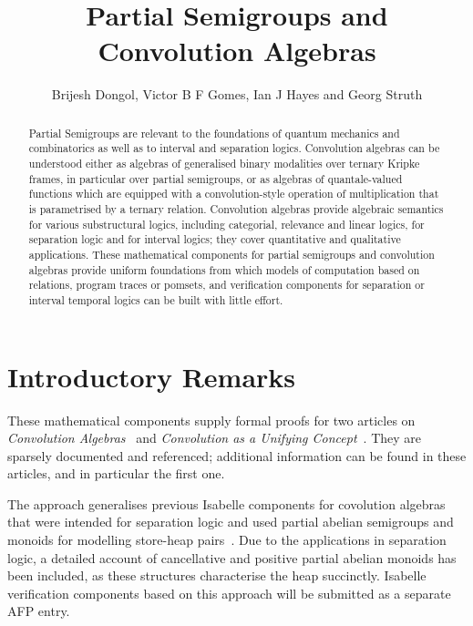 \documentclass[11pt,a4paper]{article}
\begin{document}
\title{Partial Semigroups and Convolution Algebras}
\author{Brijesh Dongol, Victor B F Gomes, Ian J Hayes and Georg
  Struth}


\maketitle

\begin{abstract}
  Partial Semigroups are relevant to the foundations of quantum
  mechanics and combinatorics as well as to interval and separation
  logics. Convolution algebras can be understood either as algebras of
  generalised binary modalities over ternary Kripke frames, in
  particular over partial semigroups, or as algebras of
  quantale-valued functions which are equipped with a
  convolution-style operation of multiplication that is parametrised
  by a ternary relation.  Convolution algebras provide algebraic
  semantics for various substructural logics, including categorial,
  relevance and linear logics, for separation logic and for interval
  logics; they cover quantitative and qualitative applications. These
  mathematical components for partial semigroups and convolution
  algebras provide uniform foundations from which models of
  computation based on relations, program traces or pomsets, and
  verification components for separation or interval temporal logics
  can be built with little effort.
\end{abstract}

\tableofcontents

\section{Introductory Remarks}

These mathematical components supply formal proofs for two articles on
\emph{Convolution Algebras}~\cite{DongolHS17} and \emph{Convolution as
  a Unifying Concept}~\cite{DongolHS16}.  They are sparsely documented
and referenced; additional information can be found in these articles,
and in particular the first one.

The approach generalises previous Isabelle components for covolution
algebras that were intended for separation logic and used partial
abelian semigroups and monoids for modelling store-heap
pairs~\cite{DongolGS15}.  Due to the applications in separation logic,
a detailed account of cancellative and positive partial abelian
monoids has been included, as these structures characterise the heap
succinctly.  Isabelle verification components based on this
approach will be submitted as a separate AFP entry.
 
\end{document}
